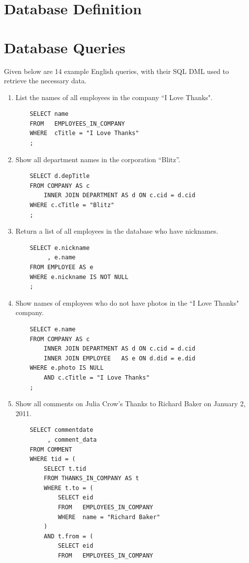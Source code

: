 \documentclass[11pt]{report}
\begin{document}
\section{Database Definition}

\section{Database Queries}
Given below are 14 example English queries, with their SQL DML used to retrieve the necessary data.
\begin{enumerate}
    \item List the names of all employees in the company ``I Love Thanks".
    \begin{verbatim}
    SELECT name
    FROM   EMPLOYEES_IN_COMPANY
    WHERE  cTitle = "I Love Thanks"
    ;
    \end{verbatim}
    \item Show all department names in the corporation ``Blitz''.
    \begin{verbatim}
    SELECT d.depTitle
    FROM COMPANY AS c
        INNER JOIN DEPARTMENT AS d ON c.cid = d.cid
    WHERE c.cTitle = "Blitz"
    ;
    \end{verbatim}
    \item Return a list of all employees in the database who have nicknames.
    \begin{verbatim}
    SELECT e.nickname
         , e.name
    FROM EMPLOYEE AS e
    WHERE e.nickname IS NOT NULL
    ;
    \end{verbatim}
    \item Show names of employees who do not have photos in the ``I Love Thanks" company.
    \begin{verbatim}
    SELECT e.name
    FROM COMPANY AS c
        INNER JOIN DEPARTMENT AS d ON c.cid = d.cid
        INNER JOIN EMPLOYEE   AS e ON d.did = e.did
    WHERE e.photo IS NULL
        AND c.cTitle = "I Love Thanks"
    ;
    \end{verbatim}
    \item Show all comments on Julia Crow's Thanks to Richard Baker on January 2, 2011.
    \begin{verbatim}
    SELECT commentdate
         , comment_data
    FROM COMMENT
    WHERE tid = (
        SELECT t.tid
        FROM THANKS_IN_COMPANY AS t
        WHERE t.to = (
            SELECT eid
            FROM   EMPLOYEES_IN_COMPANY
            WHERE  name = "Richard Baker"
        )
        AND t.from = (
            SELECT eid
            FROM   EMPLOYEES_IN_COMPANY

\end{verbatim}
\end{enumerate}
\end{document}
